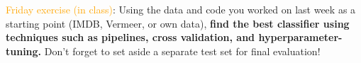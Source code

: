 \documentclass[compress]{beamer}
\begin{document}
\begin{frame}[standout]
\textcolor{orange}{Friday exercise (in class)}: Using the data and code you worked on last week as a starting point (IMDB, Vermeer, or own data), \textbf{find the best classifier using techniques such as pipelines, cross validation, and hyperparameter-tuning.} Don't forget to set aside a separate test set for final evaluation!
\end{frame}





\begin{frame}
	\printbibliography
\end{frame}
\end{document}
